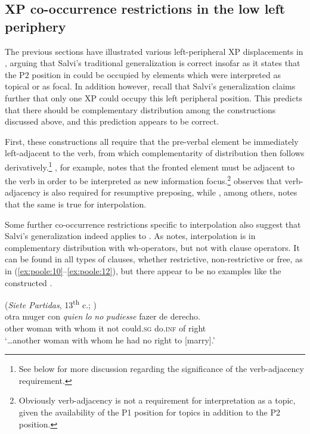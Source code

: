 \documentclass[output=paper]{LSP/langsci}
\begin{document}
\subsection{XP co-occurrence restrictions in the low left periphery}\label{sec:poole:2.5}
The previous sections have illustrated various left-peripheral XP displacements in , arguing that Salvi’s traditional generalization is correct insofar as it states that the P2 position in  could be occupied by elements which were interpreted as topical or as focal.  In addition however, recall that Salvi’s generalization claims further that only one XP could occupy this left peripheral position.  This predicts that there should be complementary distribution among the constructions discussed above, and this prediction appears to be correct.  

First, these constructions all require that the pre-verbal element be immediately left-adjacent to the verb, from which complementarity of distribution then follows derivatively.\footnote{See  below for more discussion regarding the significance of the verb-adjacency requirement.}   \citet[174]{Sitaridou2011}, for example, notes that the fronted element must be adjacent to the verb in order to be interpreted as new information focus.\footnote{Obviously verb-adjacency is not a requirement for interpretation as a topic, given the availability of the P1 position for topics in addition to the P2 position.}  \citet[392]{Mackenzie2010} observes that verb-adjacency is also required for resumptive preposing, while \citet{Poole2013}, among others, notes that the same is true for interpolation.  

Some further co-occurrence restrictions specific to interpolation also suggest that Salvi’s generalization indeed applies to .  As \citet[94--95]{Poole2013} notes, interpolation is in complementary distribution with wh-operators, but not with  clause operators.  It can be found in all types of  clauses, whether restrictive, non-restrictive or free, as in (\ref{ex:poole:10}--\ref{ex:poole:12}), but there appear to be no examples like the constructed .

\ea%
    \label{ex:poole:10}(\textit{Siete Partidas}, 13\textsuperscript{th} c.; \citealt[(51)]{Poole2013})\\
    \gll    otra muger con \textit{quien} \textit{lo} \textit{no} \textit{pudiesse} fazer de derecho.  \\
other woman with whom it not could.\textsc{sg} do.\textsc{inf} of right	\\
    \glt ‘…another woman with whom he had no right to [marry].’
    \z
\end{document}
